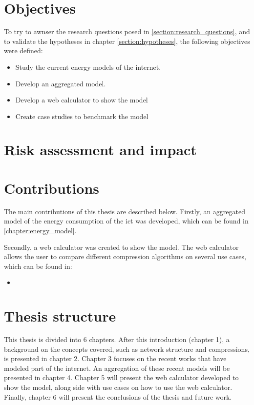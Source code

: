 \section{Objectives}

To try to awnser the research questions posed in \ref{section:research_questions}, and to validate the hypotheses in chapter \ref{section:hypotheses}, the following objectives were defined:

\begin{itemize}
    \item Study the current energy models of the internet.

    \item Develop an aggregated model.

    \item Develop a web calculator to show the model

    \item Create case studies to benchmark the model

\end{itemize}

\section{Risk assessment and impact}

\section{Contributions}

The main contributions of this thesis are described below.
Firstly, an aggregated model of the energy consumption of the \ac{ict} was developed, which can be found in \ref{chapter:energy_model}.

Secondly, a web calculator was created to show the model. The web calculator allows the user to compare different compression algorithms on several use cases, which can be found in:

\begin{itemize}
    \item %
\end{itemize}


\section{Thesis structure}

This thesis is divided into 6 chapters. After this introduction (chapter 1), a background on the concepts covered, such as network structure and compressions, is presented in chapter 2. 
Chapter 3 focuses on the recent works that have modeled part of the internet. 
An aggregation of these recent models will be presented in chapter 4. 
Chapter 5 will present the web calculator developed to show the model, along side with use cases on how to use the web calculator. 
Finally, chapter 6 will present the conclusions of the thesis and future work.


